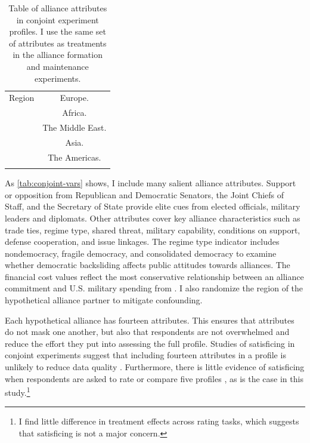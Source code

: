 \documentclass[12pt]{article}
\begin{document}
\begin{table}
\begin{adjustbox}{width = .99\textwidth}
\begin{tabular}{lc}
Region              & Europe. \\ 
                    & Africa. \\
                    & The Middle East. \\ 
                    & Asia. \\   
                    & The Americas. \\ 
                                                                            
\hline \\
\end{tabular}
\end{adjustbox}
\caption{Table of alliance attributes in conjoint experiment profiles. I use the same set of attributes as treatments in the alliance formation and maintenance experiments.} 
\label{tab:conjoint-vars}
\end{table}


As \autoref{tab:conjoint-vars} shows, I include many salient alliance attributes.
Support or opposition from Republican and Democratic Senators, the Joint Chiefs of Staff, and the Secretary of State provide elite cues from elected officials, military leaders and diplomats. 
Other attributes cover key alliance characteristics such as trade ties, regime type, shared threat, military capability, conditions on support, defense cooperation, and issue linkages.
The regime type indicator includes nondemocracy, fragile democracy, and consolidated democracy to examine whether democratic backsliding affects public attitudes towards alliances. 
The financial cost values reflect the most conservative relationship between an alliance commitment and U.S. military spending from \citet{AlleyFuhrmann2021}. 
I also randomize the region of the hypothetical alliance partner to mitigate confounding.  


Each hypothetical alliance has fourteen attributes.
This ensures that attributes do not mask one another, but also that respondents are not overwhelmed and reduce the effort they put into assessing the full profile.
Studies of satisficing in conjoint experiments suggest that including fourteen attributes in a profile is unlikely to reduce data quality \citep{Bansaketal2019}. 
Furthermore, there is little evidence of satisficing when respondents are asked to rate or compare five profiles \citep{Bansaketal2018}, as is the case in this study.\footnote{I find little difference in treatment effects across rating tasks, which suggests that satisficing is not a major concern.} 
\end{document}
